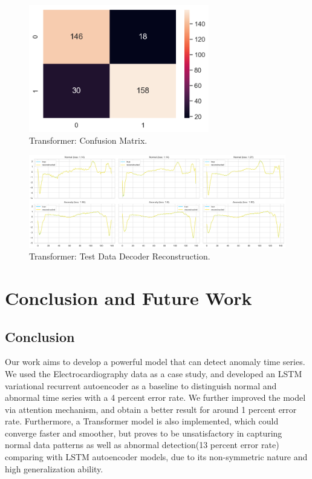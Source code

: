 \documentclass{article}
\begin{document}
\begin{figure}[!t]
    \centering
    \includegraphics[width=0.7\textwidth]{images/transformer_Confmat.png}
    \caption{Transformer: Confusion Matrix.}
\end{figure}
\begin{figure}[!t]
    \centering
    \includegraphics[width=1.0\textwidth]{images/transformer_reconstruct.png}
    \caption{Transformer: Test Data Decoder Reconstruction.}
\end{figure}

\section{Conclusion and Future Work}

\subsection{Conclusion}
Our work aims to develop a powerful model that can detect anomaly time series. We used the Electrocardiography data as a case study, and developed an LSTM variational recurrent autoencoder as a baseline to distinguish normal and abnormal time series with a 4 percent error rate. We further improved the model via attention mechanism, and obtain a better result for around 1 percent error rate. Furthermore, a Transformer model is also implemented, which could converge faster and smoother, but proves to be unsatisfactory in capturing normal data patterns as well as abnormal detection(13 percent error rate) comparing with LSTM autoencoder models, due to its non-symmetric nature and high generalization ability. 
\end{document}
